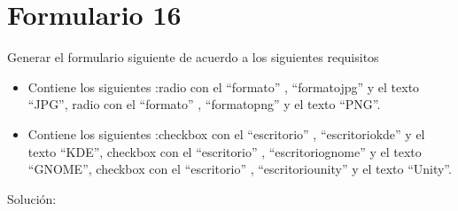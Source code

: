 \documentclass[letterpaper,10pt,spanish]{sphinxmanual}
\begin{document}
\section{Formulario 16}
\label{ejercicios/formularios/anexo_formularios:formulario-16}
Generar el formulario siguiente de acuerdo a los siguientes requisitos
\begin{itemize}
\item {} 
Contiene los siguientes :radio con el   ``formato'' ,   ``formatojpg''  y el texto ``JPG'', radio con el   ``formato'' ,   ``formatopng''  y el texto ``PNG''.

\item {} 
Contiene los siguientes :checkbox con el   ``escritorio'' ,   ``escritoriokde''  y el texto ``KDE'', checkbox con el   ``escritorio'' ,   ``escritoriognome''  y el texto ``GNOME'', checkbox con el   ``escritorio'' ,   ``escritoriounity''  y el texto ``Unity''.

\end{itemize}


Solución:
\end{document}
